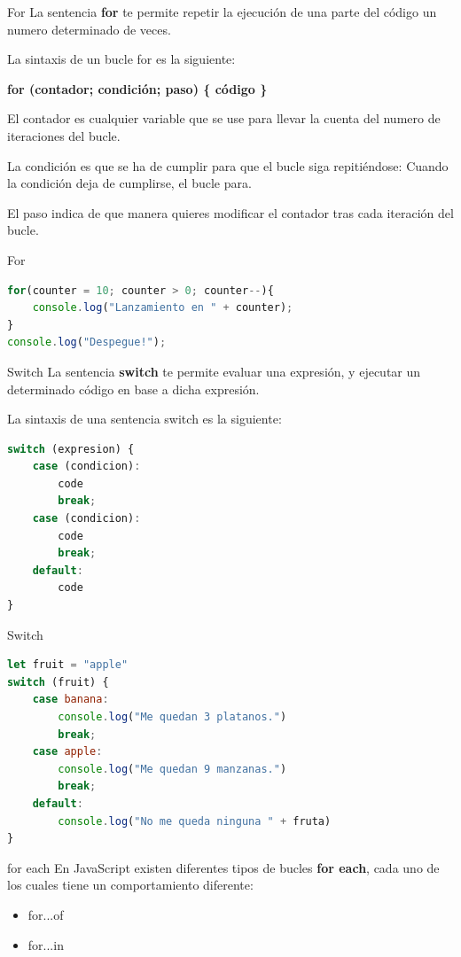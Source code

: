 \documentclass{beamer}
\begin{document}
\begin{frame}{For}
La sentencia \textbf{for} te permite repetir la ejecución de una parte del código un numero determinado de veces.

La sintaxis de un bucle for es la siguiente:

\textbf{for (contador; condición; paso) \{ código \} }

El contador es cualquier variable que se use para llevar la cuenta del numero de iteraciones del bucle.

La condición es que se ha de cumplir para que el bucle siga repitiéndose: Cuando la condición deja de cumplirse, el bucle para.

El paso indica de que manera quieres modificar el contador tras cada iteración del bucle.
\end{frame}

\begin{frame}[fragile]{For}
\begin{lstlisting}[language=JavaScript]
for(counter = 10; counter > 0; counter--){
    console.log("Lanzamiento en " + counter);
}
console.log("Despegue!");
\end{lstlisting}
\end{frame}

\begin{frame}[fragile]{Switch}
La sentencia \textbf{switch} te permite evaluar una expresión, y ejecutar un determinado código en base a dicha expresión.

La sintaxis de una sentencia switch es la siguiente:

\begin{lstlisting}[language=JavaScript]
switch (expresion) {
    case (condicion): 
        code
        break;
    case (condicion):
        code
        break;
    default:
        code
}\end{lstlisting}
\end{frame}

\begin{frame}[fragile]{Switch}
\begin{lstlisting}[language=JavaScript]
let fruit = "apple"
switch (fruit) {
    case banana: 
        console.log("Me quedan 3 platanos.")
        break;
    case apple:
        console.log("Me quedan 9 manzanas.")
        break;
    default:
        console.log("No me queda ninguna " + fruta)
}\end{lstlisting}
\end{frame}

\begin{frame}[fragile]{for each}
En JavaScript existen diferentes tipos de bucles \textbf{for each}, cada uno de los cuales tiene un comportamiento diferente:
\begin{itemize}
     \item for...of
    \item for...in
   
\end{itemize}
\end{frame}
\end{document}
